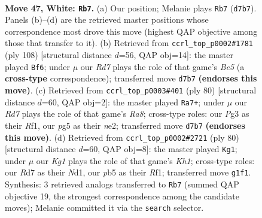 \documentclass[11pt]{article}
\begin{document}
\clearpage

\begin{figure}[p]\centering
\begin{subfigure}{0.46\textwidth}\centering
\resizebox{\linewidth}{!}{%
\newchessgame
\chessboard[
  setfen={4k3/3R4/2r5/1p2B1p1/rn6/4P1PP/b3RP2/6K1 w - - 3 47},
  showmover=false,
  pgfstyle=straightmove, color=movearrow, markmove={d7-b7}
]}
\caption{}
\end{subfigure}\hfill
\begin{subfigure}{0.46\textwidth}\centering
\resizebox{\linewidth}{!}{%
\newchessgame
\chessboard[
  setfen={4r3/8/1RP1n3/3kB1pp/1P6/5KP1/7P/8 w - - 1 55},
  showmover=false,
  pgfstyle=straightmove, color=movearrow, markmove={e5-f6}
]}
\caption{}
\end{subfigure}
\\[4pt]
\begin{subfigure}{0.46\textwidth}\centering
\resizebox{\linewidth}{!}{%
\newchessgame
\chessboard[
  setfen={R2b4/5kpp/8/8/8/P4PP1/3rn2P/5R1K w - - 4 41},
  showmover=false,
  pgfstyle=straightmove, color=movearrow, markmove={a8-a7}
]}
\caption{}
\end{subfigure}\hfill
\begin{subfigure}{0.46\textwidth}\centering
\resizebox{\linewidth}{!}{%
\newchessgame
\chessboard[
  setfen={1R6/6k1/2r5/6pp/8/6P1/2nr1P1P/3N1R1K w - - 0 41},
  showmover=false,
  pgfstyle=straightmove, color=movearrow, markmove={h1-g1}
]}
\caption{}
\end{subfigure}
\caption{\textbf{Move 47, White: \texttt{Rb7}.} (a) Our position; Melanie plays \texttt{Rb7} (\texttt{d7b7}). Panels (b)--(d) are the retrieved master positions whose correspondence most drove this move (highest QAP objective among those that transfer to it). (b) Retrieved from \texttt{ccrl\_top\_p0002\#1781} (ply 108) [structural distance $d$=56, QAP obj=14]: the master played \texttt{Bf6}; under $\mu$ our \emph{Rd7} plays the role of that game's \emph{Be5} (a \textbf{cross-type} correspondence); transferred move \texttt{d7b7} \textbf{(endorses this move)}. (c) Retrieved from \texttt{ccrl\_top\_p0003\#401} (ply 80) [structural distance $d$=60, QAP obj=2]: the master played \texttt{Ra7+}; under $\mu$ our \emph{Rd7} plays the role of that game's \emph{Ra8}; cross-type roles: our \emph{P}g3 as their \emph{R}f1, our \emph{p}g5 as their \emph{n}e2; transferred move \texttt{d7b7} \textbf{(endorses this move)}. (d) Retrieved from \texttt{ccrl\_top\_p0002\#2721} (ply 80) [structural distance $d$=60, QAP obj=8]: the master played \texttt{Kg1}; under $\mu$ our \emph{Kg1} plays the role of that game's \emph{Kh1}; cross-type roles: our \emph{R}d7 as their \emph{N}d1, our \emph{p}b5 as their \emph{R}f1; transferred move \texttt{g1f1}. Synthesis: 3 retrieved analogs transferred to \texttt{Rb7} (summed QAP objective 19, the strongest correspondence among the candidate moves); Melanie committed it via the \texttt{search} selector.}
\label{fig:thought-m92}
\end{figure}
\end{document}
